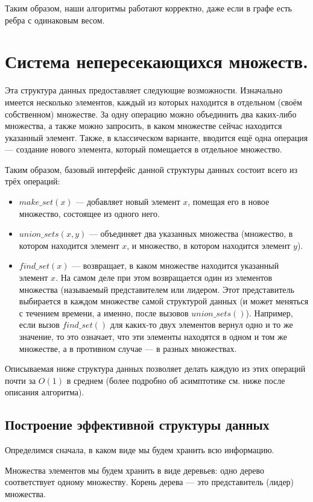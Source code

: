 \documentclass[a4paper,12pt]{article}
\begin{document}
Таким образом, наши алгоритмы работают корректно, даже если в графе есть ребра с одинаковым весом.
 
\newpage
\section{Система непересекающихся множеств.}

Эта структура данных предоставляет следующие возможности. Изначально имеется несколько элементов, каждый из которых находится в отдельном (своём собственном) множестве. За одну операцию можно объединить два каких-либо множества, а также можно запросить, в каком множестве сейчас находится указанный элемент. Также, в классическом варианте, вводится ещё одна операция — создание нового элемента, который помещается в отдельное множество.

Таким образом, базовый интерфейс данной структуры данных состоит всего из трёх операций:
\begin{itemize}
    \item $make\_set(x)$ — добавляет новый элемент $x$, помещая его в новое множество, состоящее из одного него.
    \item $union\_sets(x,y)$ — объединяет два указанных множества (множество, в котором находится элемент $x$, и множество, в котором находится элемент $y$).
    \item $find\_set(x)$ — возвращает, в каком множестве находится указанный элемент $x$. На самом деле при этом возвращается один из элементов множества (называемый представителем или лидером. Этот представитель выбирается в каждом множестве самой структурой данных (и может меняться с течением времени, а именно, после вызовов $union\_sets()$).
    Например, если вызов $find\_set()$ для каких-то двух элементов вернул одно и то же значение, то это означает, что эти элементы находятся в одном и том же множестве, а в противном случае — в разных множествах.
\end{itemize}

Описываемая ниже структура данных позволяет делать каждую из этих операций почти за $O(1)$ в среднем (более подробно об асимптотике см. ниже после описания алгоритма).

\subsection{Построение эффективной структуры данных}
Определимся сначала, в каком виде мы будем хранить всю информацию.

Множества элементов мы будем хранить в виде деревьев: одно дерево соответствует одному множеству. Корень дерева — это представитель (лидер) множества.
\end{document}
